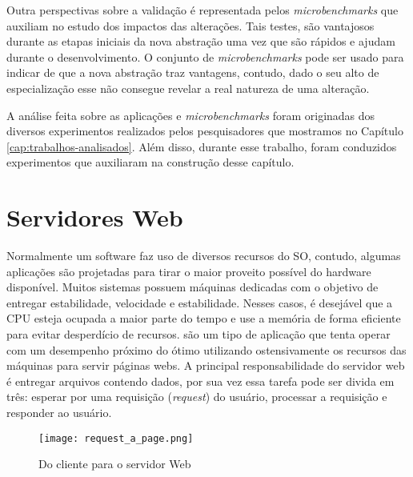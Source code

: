Outra perspectivas sobre a validação é representada pelos 
\textit{microbenchmarks} que auxiliam no estudo dos impactos das alterações.
Tais testes, são vantajosos durante as etapas iniciais da nova abstração uma
vez que são rápidos e ajudam durante o desenvolvimento. O conjunto de
\textit{microbenchmarks} pode ser usado para indicar de que a nova abstração
traz vantagens, contudo, dado o seu alto de especialização esse não consegue
revelar a real natureza de uma alteração.

A análise feita sobre as aplicações e \textit{microbenchmarks} foram originadas
dos diversos experimentos realizados pelos pesquisadores que mostramos no
Capítulo \ref{cap:trabalhos-analisados}. Além disso, durante esse trabalho,
foram conduzidos experimentos que auxiliaram na construção desse capítulo.

\section{Servidores Web}
\label{sec:web_server}

Normalmente um software faz uso de diversos recursos do SO, contudo, algumas
aplicações são projetadas para tirar o maior proveito possível do hardware
disponível. Muitos sistemas possuem máquinas dedicadas com o objetivo de
entregar estabilidade, velocidade e estabilidade. Nesses casos, é desejável que
a CPU esteja ocupada a maior parte do tempo e use a memória de forma eficiente
para evitar desperdício de recursos.  são um tipo de aplicação que tenta operar com um desempenho próximo
do ótimo utilizando ostensivamente os recursos das máquinas para servir páginas
webs. A principal responsabilidade do servidor web é entregar arquivos contendo
dados, por sua vez essa tarefa pode ser divida em três: esperar por uma
requisição (\textit{request}) do usuário, processar a requisição e responder ao
usuário.

\begin{figure}[!h]
  \centering
  \texttt{[image: request\_a\_page.png]}
  \caption{Do cliente para o servidor Web}
  \label{fig:client_to_web_server}
\end{figure}

